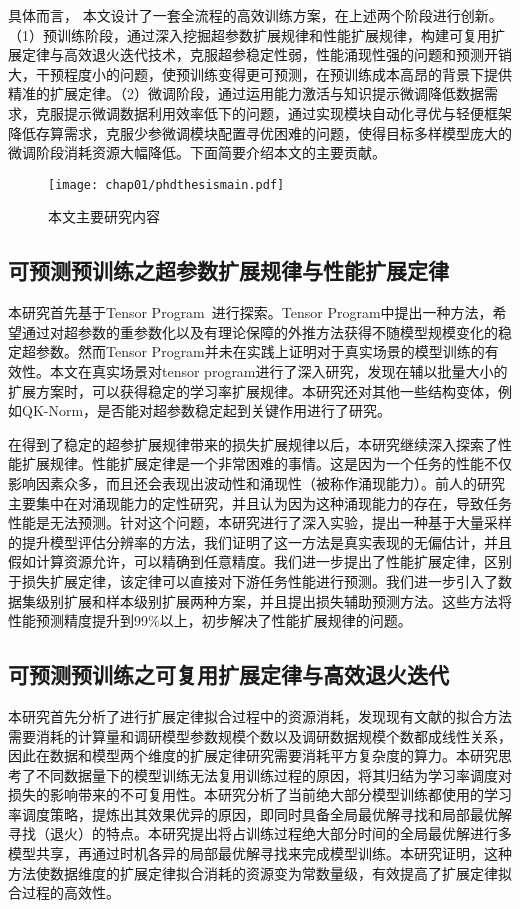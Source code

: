 具体而言， 本文设计了一套全流程的高效训练方案，在上述两个阶段进行创新。（1）预训练阶段，通过深入挖掘超参数扩展规律和性能扩展规律，构建可复用扩展定律与高效退火迭代技术，克服超参稳定性弱，性能涌现性强的问题和预测开销大，干预程度小的问题，使预训练变得更可预测，在预训练成本高昂的背景下提供精准的扩展定律。（2）微调阶段，通过运用能力激活与知识提示微调降低数据需求，克服提示微调数据利用效率低下的问题，通过实现模块自动化寻优与轻便框架降低存算需求，克服少参微调模块配置寻优困难的问题，使得目标多样模型庞大的微调阶段消耗资源大幅降低。下面简要介绍本文的主要贡献。

\begin{figure}
  \centering
  \texttt{[image: chap01/phdthesismain.pdf]}
  \label{fig:mainframework}
  \caption{本文主要研究内容}
  \end{figure}

  
\subsection{可预测预训练之超参数扩展规律与性能扩展定律}
本研究首先基于Tensor Program~\cite{yang2022tensor}进行探索。Tensor Program中提出一种方法，希望通过对超参数的重参数化以及有理论保障的外推方法获得不随模型规模变化的稳定超参数。然而Tensor Program并未在实践上证明对于真实场景的模型训练的有效性。本文在真实场景对tensor program进行了深入研究，发现在辅以批量大小的扩展方案时，可以获得稳定的学习率扩展规律。本研究还对其他一些结构变体，例如QK-Norm，是否能对超参数稳定起到关键作用进行了研究。

在得到了稳定的超参扩展规律带来的损失扩展规律以后，本研究继续深入探索了性能扩展规律。性能扩展定律是一个非常困难的事情。这是因为一个任务的性能不仅影响因素众多，而且还会表现出波动性和涌现性（被称作涌现能力）。前人的研究主要集中在对涌现能力的定性研究，并且认为因为这种涌现能力的存在，导致任务性能是无法预测。针对这个问题，本研究进行了深入实验，提出一种基于大量采样的提升模型评估分辨率的方法，我们证明了这一方法是真实表现的无偏估计，并且假如计算资源允许，可以精确到任意精度。我们进一步提出了性能扩展定律，区别于损失扩展定律，该定律可以直接对下游任务性能进行预测。我们进一步引入了数据集级别扩展和样本级别扩展两种方案，并且提出损失辅助预测方法。这些方法将性能预测精度提升到99\%以上，初步解决了性能扩展规律的问题。

\subsection{可预测预训练之可复用扩展定律与高效退火迭代}
本研究首先分析了进行扩展定律拟合过程中的资源消耗，发现现有文献的拟合方法需要消耗的计算量和调研模型参数规模个数以及调研数据规模个数都成线性关系，因此在数据和模型两个维度的扩展定律研究需要消耗平方复杂度的算力。本研究思考了不同数据量下的模型训练无法复用训练过程的原因，将其归结为学习率调度对损失的影响带来的不可复用性。本研究分析了当前绝大部分模型训练都使用的学习率调度策略，提炼出其效果优异的原因，即同时具备全局最优解寻找和局部最优解寻找（退火）的特点。本研究提出将占训练过程绝大部分时间的全局最优解进行多模型共享，再通过时机各异的局部最优解寻找来完成模型训练。本研究证明，这种方法使数据维度的扩展定律拟合消耗的资源变为常数量级，有效提高了扩展定律拟合过程的高效性。

